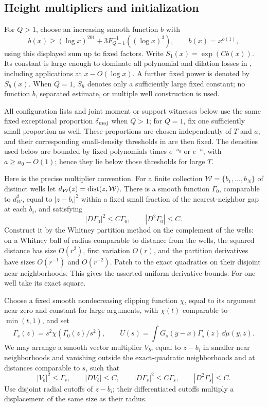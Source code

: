 \subsection{Height multipliers and initialization}

For \(Q>1\), choose an increasing smooth function \(b\) with
\[
 b(x)\ge (\log x)^{201}
       +3F_{Q-1}^{-1}((\log x)^3),\qquad b(x)=x^{o(1)},
\]
using this displayed sum up to fixed factors. Write
\(S_1(x)=\exp(Cb(x))\). Its constant is large enough to dominate
all polynomial and dilation losses in , including
applications at \(x-O(\log x)\). A further fixed power is denoted by
\(S_h(x)\). When \(Q=1\), \(S_h\) denotes only a sufficiently large
fixed constant; no function \(b\), separated estimate, or multiple
well construction is used.

All configuration lists and joint moment or support witnesses below
use the same fixed exceptional proportion \(\delta_{\rm maj}\) when
\(Q>1\); for \(Q=1\), fix one sufficiently small proportion as well.
These proportions are chosen independently of \(T\) and \(a\), and
their corresponding small-density thresholds in 
are then fixed. The densities used below are bounded by fixed
polynomials times \(e^{-a_0}\) or \(e^{-a}\), with
\(a\ge a_0-O(1)\); hence they lie below those thresholds for large \(T\).

Here is the precise multiplier convention. For a finite collection
\(\mathcal W=\{b_1,\ldots,b_N\}\) of distinct wells let
\(d_{\mathcal W}(z)=\operatorname{dist}(z,\mathcal W)\). There is a smooth function
\(\Gamma_0\), comparable to \(d_{\mathcal W}^2\), equal to
\(|z-b_i|^2\) within a fixed small fraction of the nearest-neighbor
gap at each \(b_i\), and satisfying
\[
 |D\Gamma_0|^2\le C\Gamma_0,\qquad |D^2\Gamma_0|\le C.
\]
Construct it by the Whitney partition method \cite{Whitney1934}
on the complement of the wells:
on a Whitney ball of radius comparable to distance from the wells,
the squared distance has size \(O(r^2)\), first variation \(O(r)\),
and the partition derivatives have sizes \(O(r^{-1})\) and
\(O(r^{-2})\). Patch to the exact quadratics on their disjoint near
neighborhoods. This gives the asserted uniform derivative bounds.
For one well take its exact square.

Choose a fixed smooth nondecreasing clipping function \(\chi\),
equal to its argument near zero and constant for large arguments,
with \(\chi(t)\) comparable to \(\min(t,1)\), and set
\begin{equation}
 \Gamma_s(z)=s^2\chi(\Gamma_0(z)/s^2),\qquad
 U(s)=\int G_s(y-x)\Gamma_s(z)\,\dd\mu(y,z).
 \label{ex:moment}
\end{equation}
We may arrange a smooth vector multiplier \(V_b\), equal to
\(z-b_i\) in smaller near neighborhoods and vanishing outside
the exact-quadratic neighborhoods and at distances comparable to
\(s\), such that
\begin{equation}
 |V_b|^2\le\Gamma_s,\qquad |DV_b|\le C,\qquad
 |D\Gamma_s|^2\le C\Gamma_s,\qquad |D^2\Gamma_s|\le C.
 \label{ex:multiplier-bounds}
\end{equation}
Use disjoint radial cutoffs of \(z-b_i\); their differentiated
cutoffs multiply a displacement of the same size as their radius.


